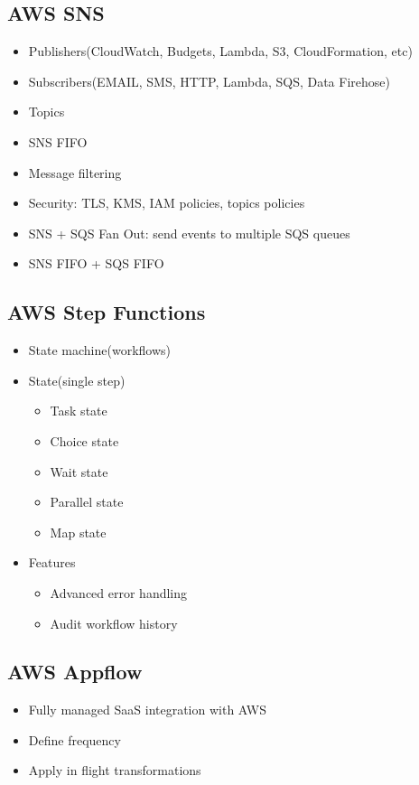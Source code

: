 \documentclass[../../main.tex]{subfiles}
\begin{document}
\subsection{AWS SNS}
\begin{itemize}
    \item Publishers(CloudWatch, Budgets, Lambda, S3, CloudFormation, etc)
    \item Subscribers(EMAIL, SMS, HTTP, Lambda, SQS, Data Firehose)
    \item Topics
    \item SNS FIFO
    \item Message filtering
    \item Security: TLS, KMS, IAM policies, topics policies
    \item SNS + SQS Fan Out: send events to multiple SQS queues
    \item SNS FIFO + SQS FIFO
\end{itemize}

\subsection{AWS Step Functions}
\begin{itemize}
    \item State machine(workflows)
    \item State(single step)
    \begin{itemize}
        \item Task state
        \item Choice state
        \item Wait state
        \item Parallel state
        \item Map state
    \end{itemize}
    \item Features
    \begin{itemize}
        \item Advanced error handling
        \item Audit workflow history
    \end{itemize}
\end{itemize}

\subsection{AWS Appflow}
\begin{itemize}
    \item Fully managed SaaS integration with AWS
    \item Define frequency
    \item Apply in flight transformations
\end{itemize}
\end{document}
